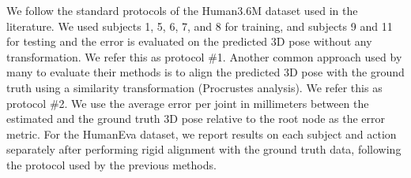 \documentclass[runningheads]{llncs}
\begin{document}
We follow the standard protocols of the Human3.6M dataset used in the literature. We used subjects 1, 5, 6, 7, and 8 for training, and subjects 9 and 11 for testing and the error is evaluated on the predicted 3D pose without any transformation. We refer this as protocol \#1. Another common approach used by many to evaluate their methods is to align the predicted 3D pose with the ground truth using a similarity transformation (Procrustes analysis). We refer this as protocol \#2. We use the average error per joint in millimeters between the estimated and the ground truth 3D pose relative to the root node as the error metric. For the HumanEva dataset, we report results on each subject and action separately after performing rigid alignment with the ground truth data, following the protocol used by the previous methods. 
\end{document}
